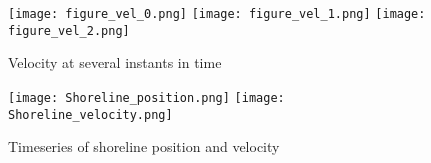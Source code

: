 \begin{figure}
\begin{center}
\texttt{[image: figure\_vel\_0.png]}
\texttt{[image: figure\_vel\_1.png]}
\texttt{[image: figure\_vel\_2.png]}
\caption{Velocity at several instants in time}
\label{fig:vel}
\end{center}
\end{figure}

\begin{figure}
\begin{center}
\texttt{[image: Shoreline\_position.png]}
\texttt{[image: Shoreline\_velocity.png]}
\caption{Timeseries of shoreline position and velocity}
\label{fig:shore}
\end{center}
\end{figure}


\endinput
